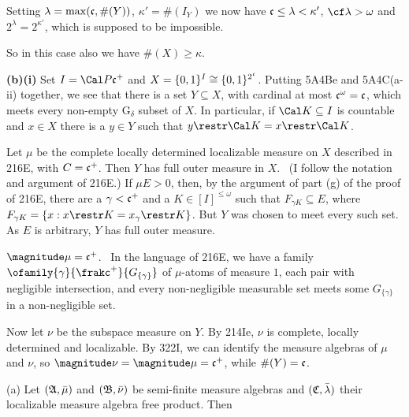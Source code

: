 {

\noindent Setting $\lambda=\max(\frak c,\#(Y))$, $\kappa'=\#(I_Y)$ we
now have $\frak c\le\lambda<\kappa'$, $\cf\lambda>\omega$ and
$2^{\lambda}=2^{\kappa'}$, which is supposed to be impossible.\ \Bang

So in this case also we have $\#(X)\ge\kappa$.

\medskip

{\bf (b)(i)} Set $I=\Cal P\frak c^+$ and
$X=\{0,1\}^I\cong\{0,1\}^{2^{\frak c}}$.   Putting 5A4Be and 5A4C(a-ii)
together, we see that there is a set $Y\subseteq X$, with cardinal
at most $\frak c^{\omega}=\frak c$, which meets every non-empty
G$_{\delta}$ subset of $X$.   In particular, if $\Cal K\subseteq I$ is
countable and $x\in X$ there is a $y\in Y$ such that
$y\restr\Cal K=x\restr\Cal K$.

\medskip

 Let $\mu$ be the complete locally determined
localizable
measure on $X$ described in 216E, with $C=\frak c^+$.   Then $Y$ has
full outer measure in $X$.   \Prf\ (I follow the notation and argument
of 216E.)   If
$\mu E>0$, then, by the argument of part (g) of the proof of 216E,
there are a $\gamma<\frak c^+$ and a $K\in[I]^{\le\omega}$ such that
$F_{\gamma K}\subseteq E$, where
$F_{\gamma K}=\{x:x\restr K=x_{\gamma}\restr K\}$.   But $Y$ was
chosen to meet every such set.   As $E$ is arbitrary, $Y$ has full outer
measure.\ \Qed

\medskip

 $\magnitude\mu=\frak c^+$.   \Prf\ In the language of
216E, we have a family $\ofamily{\gamma}{\frakc^+}{G_{\{\gamma\}}}$ of
$\mu$-atoms of measure $1$, each pair with negligible intersection,
and every non-negligible measurable set meets some $G_{\{\gamma\}}$ in a
non-negligible set.\ \Qed

\medskip

 Now let $\nu$ be the subspace measure on $Y$.   By
214Ie, $\nu$ is complete, locally determined and localizable.   By
322I, we can identify the measure algebras of $\mu$ and $\nu$, so
$\magnitude\nu=\magnitude\mu=\frak c^+$, while $\#(Y)=\frak c$.
}%

 (a) Let $(\frak A,\bar\mu)$ and
$(\frak B,\bar\nu)$ be semi-finite measure algebras and
$(\frak C,\bar\lambda)$ their localizable measure algebra free product.
Then

